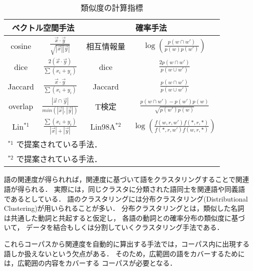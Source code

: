 \documentclass[japanese]{jnlp_1.3a}
\begin{document}
\begin{table}[b]
 \begin{center}
  \caption{類似度の計算指標}
    \label{CompareMethod}
  \begin{tabular}{|c|c|c|c|}
   \hline
    \multicolumn{2}{|c|}{ベクトル空間手法} & \multicolumn{2}{|c|}{確率手法} \\ \hline
   cosine &
       $\frac{\vec{x} \cdot \vec{y}}{\sqrt{|\vec{x}||\vec{y}|}}$ &
   相互情報量 & 
   $\log \left( \frac{p(w \cap w')}{p(w)p(w')}\right)$  \\ \hline

   dice & 
   $\frac{2(\vec{x} \cdot \vec{y})}{\sum(x_i+y_i)}$ &
   dice & 
   $\frac{2p(w \cap w')}{p(w \cup w')}$ \\ \hline

   Jaccard & 
   $\frac{\vec{x} \cdot \vec{y}}{\sum(x_i+y_i)}$ &
   Jaccard & 
   $\frac{p(w \cap w')}{p(w \cup w')}$  \\ \hline

   overlap & 
   $\frac{|\vec{x} \cap  \vec{y}|}{min(|\vec{x}|,|\vec{y}|)} $ &
   T検定 & 
   $\frac{p(w \cap w')-p(w')p(w)}{\sqrt{p(w')p(w)}}$ \\ \hline

       Lin$^{*1}$ & 
   $\frac{\sum(x_i+y_i)}{|\vec{x}| + |\vec{y}|}$ & 
       Lin98A$^{*2}$\footnotemark &
   $\log \left(\frac{f(w,r,w')f(*,r,*)}{f(*,r,w')f(w,r,*)}\right)$ \\   \hline   
\multicolumn{4}{l}{$^{*1}$ \cite{Lin98a}で提案されている手法．}\\
\multicolumn{4}{l}{$^{*2}$ \cite{Lin98a}で提案されている手法．}
   \end{tabular}
  \end{center}
\end{table}


語の関連度が得られれば，関連度に基づいて語をクラスタリングすることで関連語が得られる．
実際には，同じクラスタに分類された語同士を関連語や同義語であるとしている．
語のクラスタリングには分布クラスタリング(Distributional Clustering)が用いられることが多い．
分布クラスタリングとは，類似した名詞は共通した動詞と共起すると仮定し，
各語の動詞との確率分布の類似度に基づいて，
データを結合もしくは分割していくクラスタリング手法である\cite{Pereira93,HangLi98,Dhillon02}．

これらコーパスから関連度を自動的に算出する手法では，コーパス内に出現する
語しか扱えないという欠点がある．
そのため，広範囲の語をカバーするためには，広範囲の内容をカバーする
コーパスが必要となる．
\end{document}
